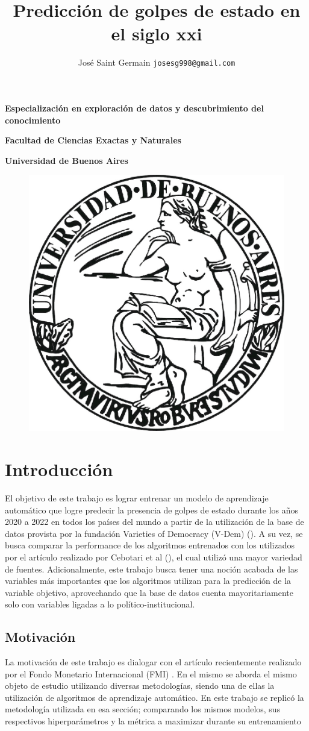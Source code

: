 \documentclass{article}
\title{Predicción de golpes de estado en el siglo xxi}
\author{José Saint Germain \texttt{josesg998@gmail.com} }
\begin{document}
\maketitle

\textbf{\Large Especialización en exploración de datos y descubrimiento del conocimiento}

\textbf{\Large Facultad de Ciencias Exactas y Naturales}

\textbf{\Large Universidad de Buenos Aires}

\begin{figure}[H]
  \centering  
  \includegraphics[width=.5\textwidth]{0_portada.jpg}
\end{figure}

\pagebreak
\tableofcontents
\pagebreak

\section{Introducción}
El objetivo de este trabajo es lograr entrenar un modelo de aprendizaje automático
que logre predecir la presencia de golpes de estado durante los años 
2020 a 2022 en todos los países del mundo a partir de la utilización de la base de datos 
provista por la fundación Varieties of Democracy (V-Dem) (\cite{Cop24}). A su vez, se 
busca comparar la performance de los algoritmos entrenados con los utilizados por el artículo
realizado por Cebotari et al (\cite{Ceb24}), el cual utilizó una mayor variedad de fuentes. 
Adicionalmente, este trabajo busca tener una noción acabada de las variables más importantes 
que los algoritmos utilizan para la predicción de la variable objetivo, aprovechando que la
base de datos cuenta mayoritariamente solo con variables ligadas a lo político-institucional.

\subsection{Motivación}
La motivación de este trabajo es dialogar con el artículo recientemente realizado por el 
Fondo Monetario Internacional (FMI) \cite{Ceb24}. En el mismo se aborda el mismo objeto 
de estudio utilizando diversas metodologías, siendo una de ellas la utilización de 
algoritmos de aprendizaje automático. En este trabajo se replicó la metodología utilizada 
en esa sección; comparando los mismos modelos, sus respectivos hiperparámetros y la 
métrica a maximizar durante su entrenamiento
\end{document}
